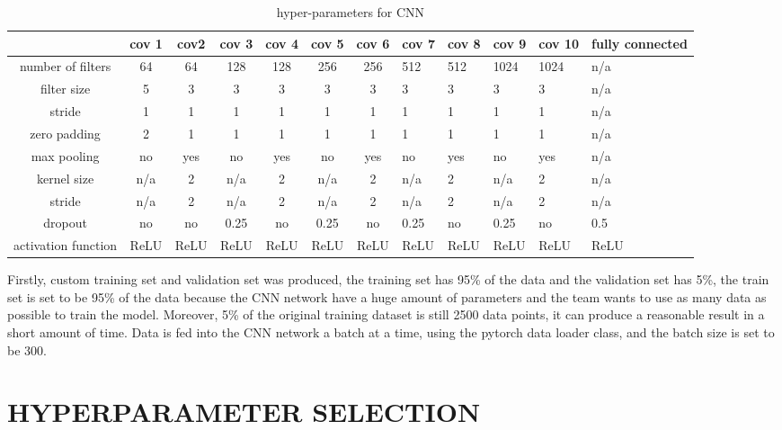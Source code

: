 \documentclass[letterpaper, 10 pt, conference]{ieeeconf}  %
\begin{document}
\begin{table}[t]
	\centering
	\caption{hyper-parameters for CNN}
	\label{tab:hyperparams}
	\begin{tabular}{|c|c|c|c|c|c|c|l|l|l|l|l|}
		\hline
	&cov 1	&cov2	&cov 3	&cov 4	&cov 5	&cov 6	&cov 7&	cov 8&	cov 9	&cov 10&	fully connected\\\hline
number of filters&	64	&64	&128	&128	&256	&256	&512	&512&	1024	&1024	&n/a \\\hline
filter size&5&3	&3	&3	&3	&3	&3	&3	&3	&3	&n/a\\\hline
stride	&1	&1	&1	&1	&1	&1	&1	&1	&1	&1	&n/a\\\hline
zero padding &2	&1	&1	&1	&1	&1	&1	&1	&1	&1	&n/a\\\hline
max pooling	&no&	yes&	no&	yes&	no&	yes&	no&	yes&	no	&yes&n/a\\\hline
kernel size&	n/a&	2&	n/a&	2&	n/a&	2	&n/a	&2	&n/a&2&n/a\\\hline
stride	&n/a&2&	n/a	&2	&n/a&2	&n/a&2	&n/a&2&	n/a\\\hline
dropout	&no&	no&	0.25&	no	&0.25&	no&	0.25&no&0.25&no&0.5\\\hline
activation function &	ReLU&	ReLU&	ReLU&	ReLU&	ReLU&	ReLU&	ReLU&	ReLU	&ReLU&	ReLU&	ReLU\\\hline
\end{tabular}
\end{table}
Firstly, custom training set and validation set was produced, the training set has 95\% of the data and the validation set has 5\%, the train set is set to be 95\% of the data because the CNN network have a huge amount of parameters and the team wants to use as many data as possible to train the model. Moreover, 5\% of the original training dataset is still 2500 data points, it can produce a reasonable result in a short amount of time. 
Data is fed into the CNN network a batch at a time, using the pytorch data loader class, and the batch size is set to be 300.


\section{HYPERPARAMETER SELECTION}\label{sec:hyperParams}
\end{document}
